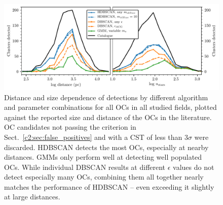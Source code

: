 \begin{figure}[ht]
   \centering
   \includegraphics[width=\textwidth]{fig/c2/fig_crossmatches.pdf}
   \caption{Distance and size dependence of detections by different algorithm and parameter combinations for all  OCs in all studied fields, plotted against the reported size and distance of the OCs in the literature. OC candidates not passing the criterion in Sect.~\ref{c2:sec:false_positives} and with a CST of less than 3$\sigma$ were discarded. HDBSCAN detects the most OCs, especially at nearby distances. GMMs only perform well at detecting well populated OCs. While individual DBSCAN results at different $\epsilon$ values do not detect especially many OCs, combining them all together nearly matches the performance of HDBSCAN -- even exceeding it slightly at large distances.}\label{c2:fig:detections_by_distance}%
\end{figure}

